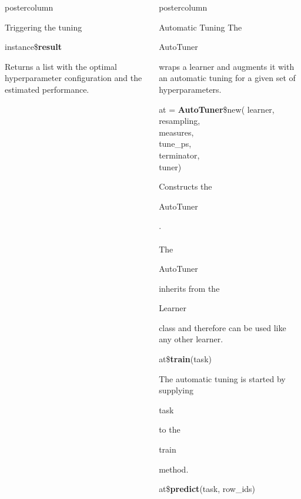 \documentclass{beamer}
\newlength{\columnheight} %
\newcommand{\codeinline}[1]{\begin{codeboxinline}#1\end{codeboxinline}}
\begin{document}
\begin{frame}[fragile]{}
\begin{columns}
\begin{column}{.245\textwidth}
\begin{beamercolorbox}[center]{postercolumn}
\begin{minipage}{.98\textwidth}
{\begin{myblock}{Triggering the tuning}
							\begin{codebox}
								instance\$\textbf{result}
							\end{codebox}
							Returns a list with the optimal hyperparameter configuration and the estimated performance.
						\end{myblock}
						\vfill}
				\end{minipage}
			\end{beamercolorbox}
		\end{column}
		\begin{column}{.245\textwidth}
			\begin{beamercolorbox}[center]{postercolumn}
				\begin{minipage}{.98\textwidth}
					\parbox[t][\columnheight]{\textwidth}{
						\begin{myblock}{Automatic Tuning}
							The \codeinline{AutoTuner} wraps a learner and augments it with an automatic tuning for a given set of hyperparameters.
							\\
							\begin{codeboxmultiline}[width=18cm]
								at = \textbf{AutoTuner}\$new(
								\hspace*{1ex}learner,\\
								\hspace*{1ex}resampling,\\
								\hspace*{1ex}measures,\\
								\hspace*{1ex}tune\_ps,\\
								\hspace*{1ex}terminator,\\
								\hspace*{1ex}tuner)
							\end{codeboxmultiline}
							Constructs the \codeinline{AutoTuner}.
							\\
							\\
							The \codeinline{AutoTuner} inherits from the \codeinline{Learner} class and therefore can be used like any other learner.
							\\
							\begin{codebox}
								at\$\textbf{train}(task)
							\end{codebox}
							The automatic tuning is started by supplying \codeinline{task} to the \codeinline{train} method.
							\\
							\begin{codebox}
								at\$\textbf{predict}(task, row\_ids)

\end{codebox}
\end{myblock}}
\end{minipage}
\end{beamercolorbox}
\end{column}
\end{columns}
\end{frame}
\end{document}
